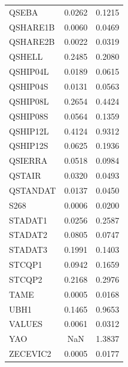 \begin{longtable}{lcc}
QSEBA & 0.0262 & 0.1215 \\
QSHARE1B & 0.0060 & 0.0469 \\
QSHARE2B & 0.0022 & 0.0319 \\
QSHELL & 0.2485 & 0.2080 \\
QSHIP04L & 0.0189 & 0.0615 \\
QSHIP04S & 0.0131 & 0.0563 \\
QSHIP08L & 0.2654 & 0.4424 \\
QSHIP08S & 0.0564 & 0.1359 \\
QSHIP12L & 0.4124 & 0.9312 \\
QSHIP12S & 0.0625 & 0.1936 \\
QSIERRA & 0.0518 & 0.0984 \\
QSTAIR & 0.0320 & 0.0493 \\
QSTANDAT & 0.0137 & 0.0450 \\
S268 & 0.0006 & 0.0200 \\
STADAT1 & 0.0256 & 0.2587 \\
STADAT2 & 0.0805 & 0.0747 \\
STADAT3 & 0.1991 & 0.1403 \\
STCQP1 & 0.0942 & 0.1659 \\
STCQP2 & 0.2168 & 0.2976 \\
TAME & 0.0005 & 0.0168 \\
UBH1 & 0.1465 & 0.9653 \\
VALUES & 0.0061 & 0.0312 \\
YAO & NaN & 1.3837 \\
ZECEVIC2 & 0.0005 & 0.0177 \\
\end{longtable}
